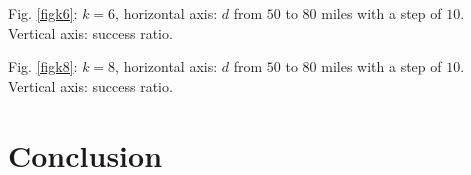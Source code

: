 \documentclass[conference]{IEEEtran}
\theoremstyle{definition}
\begin{document}
Fig. \ref{figk6}: $k=6$, horizontal axis: $d$ from $50$ to $80$ miles with a step of $10$. Vertical axis: success ratio.

Fig. \ref{figk8}: $k=8$, horizontal axis: $d$ from $50$ to $80$ miles with a step of $10$. Vertical axis: success ratio.

\section{Conclusion} \label{conclusion}



\end{document}

